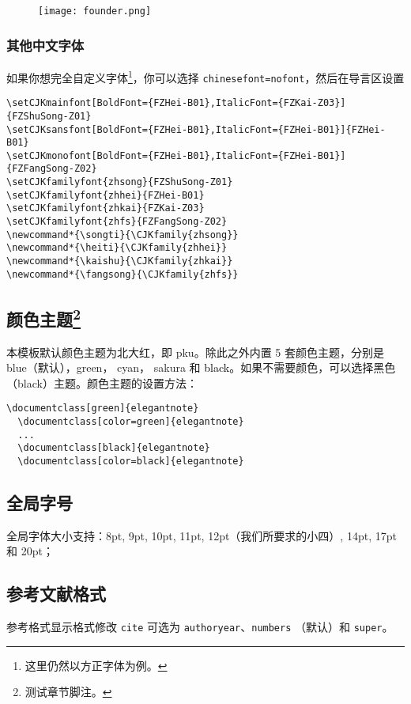 \documentclass[cn,hazy,pku,12pt,normal,math=newtx,cite=super]{elegantnote}
\begin{document}
\begin{figure}[!htb]
\centering
\texttt{[image: founder.png]}
\end{figure}

\subsubsection{其他中文字体}
如果你想完全自定义字体\footnote{这里仍然以方正字体为例。}，你可以选择 \lstinline{chinesefont=nofont}，然后在导言区设置
\begin{lstlisting}
\setCJKmainfont[BoldFont={FZHei-B01},ItalicFont={FZKai-Z03}]{FZShuSong-Z01}
\setCJKsansfont[BoldFont={FZHei-B01},ItalicFont={FZHei-B01}]{FZHei-B01}
\setCJKmonofont[BoldFont={FZHei-B01},ItalicFont={FZHei-B01}]{FZFangSong-Z02}
\setCJKfamilyfont{zhsong}{FZShuSong-Z01}
\setCJKfamilyfont{zhhei}{FZHei-B01}
\setCJKfamilyfont{zhkai}{FZKai-Z03}
\setCJKfamilyfont{zhfs}{FZFangSong-Z02}
\newcommand*{\songti}{\CJKfamily{zhsong}}
\newcommand*{\heiti}{\CJKfamily{zhhei}}
\newcommand*{\kaishu}{\CJKfamily{zhkai}}
\newcommand*{\fangsong}{\CJKfamily{zhfs}}
\end{lstlisting}


\subsection[颜色主题]{颜色主题\footnote{测试章节脚注。}}

本模板默认颜色主题为北大红，即 \textcolor{pku}{pku}。除此之外内置 5 套颜色主题，分别是 \textcolor{eblue}{blue}（默认），\textcolor{egreen}{green}， \textcolor{ecyan}{cyan}， \textcolor{sakura}{sakura} 和 \textcolor{black}{black}。如果不需要颜色，可以选择黑色（black）主题。颜色主题的设置方法：
\begin{lstlisting}[frame=none]  
  \documentclass[green]{elegantnote}
  \documentclass[color=green]{elegantnote}
  ...
  \documentclass[black]{elegantnote}
  \documentclass[color=black]{elegantnote}
\end{lstlisting}

\subsection{全局字号}
全局字体大小支持：8pt, 9pt, 10pt, 11pt, 12pt（我们所要求的小四）, 14pt, 17pt 和 20pt；

\subsection{参考文献格式}
参考格式显示格式修改 \lstinline{cite} 可选为 \lstinline{authoryear}、\lstinline{numbers} （默认）和 \lstinline{super}。
\end{document}
